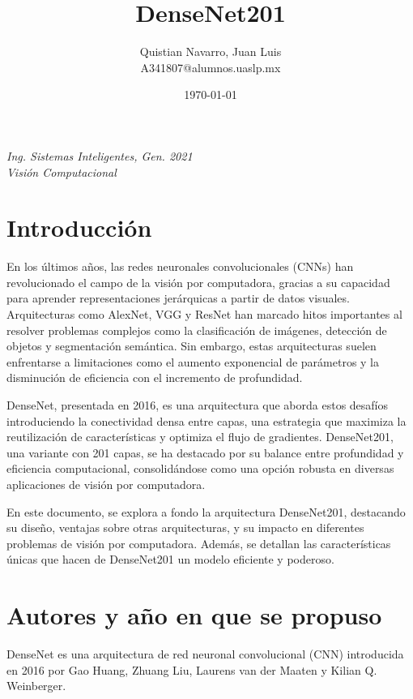 \documentclass{article}
\title{DenseNet201}
\author{
  \begin{minipage}[t]{0.4\linewidth}
    \centering
    Quistian Navarro, Juan Luis\\
    A341807@alumnos.uaslp.mx 
  \end{minipage}
}
\date{\today}
\begin{document}
\maketitle

\begin{minipage}{\textwidth}
    \centering
    \textit{Ing. Sistemas Inteligentes, Gen. 2021} \\
    \textit{Visión Computacional}
\end{minipage}

\section{Introducción}

En los últimos años, las redes neuronales convolucionales (CNNs) han revolucionado el campo de la visión por computadora, gracias a su capacidad para aprender representaciones jerárquicas a partir de datos visuales. Arquitecturas como AlexNet, VGG y ResNet han marcado hitos importantes al resolver problemas complejos como la clasificación de imágenes, detección de objetos y segmentación semántica. Sin embargo, estas arquitecturas suelen enfrentarse a limitaciones como el aumento exponencial de parámetros y la disminución de eficiencia con el incremento de profundidad.

DenseNet, presentada en 2016, es una arquitectura que aborda estos desafíos introduciendo la conectividad densa entre capas, una estrategia que maximiza la reutilización de características y optimiza el flujo de gradientes. DenseNet201, una variante con 201 capas, se ha destacado por su balance entre profundidad y eficiencia computacional, consolidándose como una opción robusta en diversas aplicaciones de visión por computadora.

En este documento, se explora a fondo la arquitectura DenseNet201, destacando su diseño, ventajas sobre otras arquitecturas, y su impacto en diferentes problemas de visión por computadora. Además, se detallan las características únicas que hacen de DenseNet201 un modelo eficiente y poderoso.

\section{Autores y año en que se propuso}

DenseNet es una arquitectura de red neuronal convolucional (CNN) introducida en 2016 por Gao Huang, Zhuang Liu, Laurens van der Maaten y Kilian Q. Weinberger.
\end{document}
